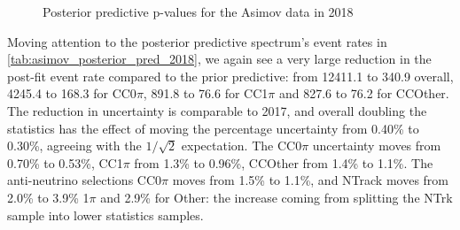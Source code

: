 \begin{figure}[h]
\begin{subfigure}[t]{0.49\textwidth}
	\end{subfigure}
	\caption{Posterior predictive p-values for the Asimov data in 2018}
	\label{fig:postpred_asimov_2018}
\end{figure}

Moving attention to the posterior predictive spectrum's event rates in \autoref{tab:asimov_posterior_pred_2018}, we again see a very large reduction in the post-fit event rate compared to the prior predictive: from 12411.1 to 340.9 overall, 4245.4 to 168.3 for CC0$\pi$, 891.8 to 76.6 for CC1$\pi$ and 827.6 to 76.2 for CCOther. The reduction in uncertainty is comparable to 2017, and overall doubling the statistics has the effect of moving the percentage uncertainty from 0.40\% to 0.30\%, agreeing with the $1/\sqrt{2}$ expectation. The CC0$\pi$ uncertainty moves from 0.70\% to 0.53\%, CC1$\pi$ from 1.3\% to 0.96\%, CCOther from 1.4\% to 1.1\%. The anti-neutrino selections CC0$\pi$ moves from 1.5\% to 1.1\%, and NTrack moves from 2.0\% to 3.9\% 1$\pi$ and 2.9\% for Other: the increase coming from splitting the NTrk sample into lower statistics samples.
